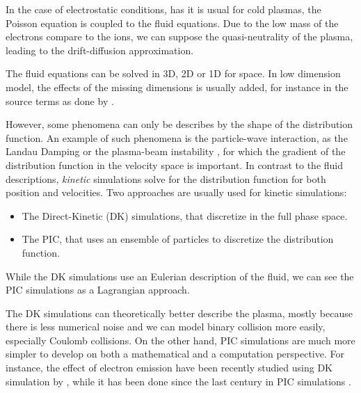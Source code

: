 In the case of electrostatic conditions, has it is usual for cold plasmas, the Poisson equation is coupled to the fluid equations.
Due to the low mass of the electrons compare to the ions, we can suppose the quasi-neutrality of the plasma, leading to the drift-diffusion approximation.

The fluid equations can be solved in \ac{3D}, \ac{2D} or \ac{1D} for space.
In low dimension model, the effects of the missing dimensions is usually added, for instance in the source terms as done by \citet{barral2003a}.

However, some phenomena can only be describes by the shape of the distribution function.
An example of such phenomena is the particle-wave interaction, as the Landau Damping \citep{landau1945,malmberg1964} or the plasma-beam instability \citep{filippychev1990}, for which the gradient of the distribution function in the velocity space is important.
In contrast to the fluid descriptions, \emph{ kinetic} simulations solve for the distribution function for both position  and velocities.
Two approaches are usually used for kinetic simulations:
\begin{itemize}
  \item The Direct-Kinetic (DK) simulations, that discretize  in the full phase space.
  \item The \ac{PIC}, that uses an ensemble of particles to discretize the distribution function.
\end{itemize} 
While the \ac{DK} simulations use an Eulerian description of the fluid, we can see the \ac{PIC} simulations as a Lagrangian approach.

The \ac{DK} simulations can theoretically better describe the plasma, mostly because there is less numerical noise and we can model binary collision more easily, especially Coulomb collisions.
On the other hand, \ac{PIC} simulations are much more simpler to develop on both a mathematical and a computation perspective.
For instance, the effect of electron emission have been recently studied using \ac{DK} simulation by \citet{cagas2019}, while it has been done since the last century in \ac{PIC} simulations \citep{boswell1988}.


